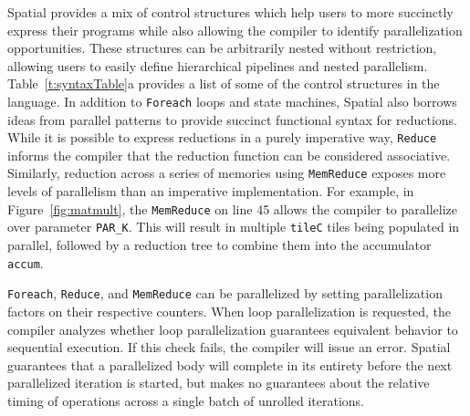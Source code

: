 Spatial provides a mix of control structures which help users to more succinctly express their programs while also allowing the compiler to identify parallelization opportunities.
These structures can be arbitrarily nested without restriction, allowing users to easily define hierarchical pipelines and nested parallelism. Table~\ref{t:syntaxTable}a provides a list of some of the control structures in the language. In addition to \texttt{\small{Foreach}} loops and state machines, Spatial also borrows ideas
from parallel patterns \cite{delite-tecs14, pldi13halide} to provide succinct functional syntax for reductions.
While it is possible to express
reductions in a purely imperative way, \texttt{\small{Reduce}} informs the compiler that the
reduction function can be considered associative.
Similarly, reduction across a series of memories using \texttt{\small{MemReduce}} exposes more levels of parallelism than an imperative implementation.
For example, in Figure~\ref{fig:matmult}, the \texttt{\small{MemReduce}} on line 45 allows the compiler to parallelize over parameter \texttt{\small{PAR\_K}}. This will result in multiple \texttt{\small{tileC}} tiles being populated in parallel, followed by a reduction tree to combine them into the accumulator \texttt{\small{accum}}.

\texttt{\small{Foreach}}, \texttt{\small{Reduce}}, and \texttt{\small{MemReduce}} can be parallelized by setting parallelization factors on their respective counters.
When loop parallelization is requested, the compiler analyzes whether
loop parallelization guarantees equivalent behavior to sequential execution.
If this check fails, the compiler will issue an error.
Spatial guarantees that a parallelized body will complete in its entirety before the next parallelized iteration is started, but makes no guarantees about the relative timing of operations across a single batch of unrolled iterations.


